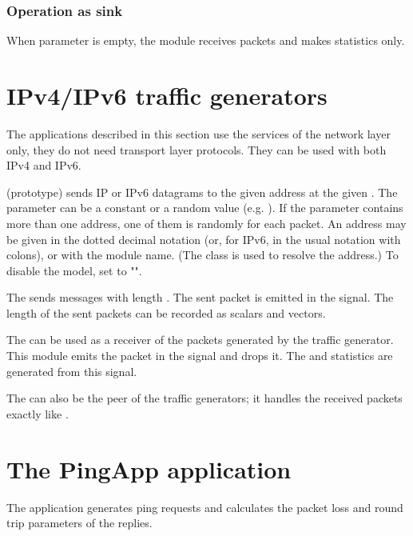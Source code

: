 \subsubsection*{Operation as sink}

When  parameter is empty, the module receives packets and makes statistics only.


\section{IPv4/IPv6 traffic generators}

The applications described in this section use the services of the network
layer only, they do not need transport layer protocols.
They can be used with both IPv4 and IPv6.

 (prototype) sends IP or IPv6 datagrams to the
given address at the given .
The  parameter can be a constant or a random value (e.g.
). If the  parameter contains more than
one address, one of them is randomly for each packet. An address may be given in
the dotted decimal notation (or, for IPv6, in the usual notation with colons),
or with the module name. (The  class is used to
resolve the address.) To disable the model, set  to "".

The  sends messages with length .
The sent packet is emitted in the  signal.
The length of the sent packets can be recorded as scalars and vectors.

The  can be used as a receiver of the packets
generated by the traffic generator. This module emits the packet
in the  signal and drops it. The 
and  statistics are generated from this signal.

The  can also be the peer of the traffic generators;
it handles the received packets exactly like .

\section{The PingApp application}

The  application
generates ping requests and calculates the packet loss and round trip
parameters of the replies.

